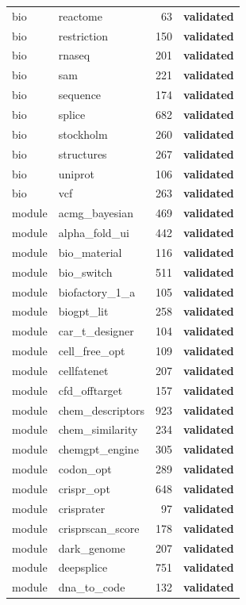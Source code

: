 \begin{center}
\begin{longtable}{llrl}
bio & reactome & 63 & \textbf{validated}\\
bio & restriction & 150 & \textbf{validated}\\
bio & rnaseq & 201 & \textbf{validated}\\
bio & sam & 221 & \textbf{validated}\\
bio & sequence & 174 & \textbf{validated}\\
bio & splice & 682 & \textbf{validated}\\
bio & stockholm & 260 & \textbf{validated}\\
bio & structures & 267 & \textbf{validated}\\
bio & uniprot & 106 & \textbf{validated}\\
bio & vcf & 263 & \textbf{validated}\\
module & acmg\_bayesian & 469 & \textbf{validated}\\
module & alpha\_fold\_ui & 442 & \textbf{validated}\\
module & bio\_material & 116 & \textbf{validated}\\
module & bio\_switch & 511 & \textbf{validated}\\
module & biofactory\_1\_a & 105 & \textbf{validated}\\
module & biogpt\_lit & 258 & \textbf{validated}\\
module & car\_t\_designer & 104 & \textbf{validated}\\
module & cell\_free\_opt & 109 & \textbf{validated}\\
module & cellfatenet & 207 & \textbf{validated}\\
module & cfd\_offtarget & 157 & \textbf{validated}\\
module & chem\_descriptors & 923 & \textbf{validated}\\
module & chem\_similarity & 234 & \textbf{validated}\\
module & chemgpt\_engine & 305 & \textbf{validated}\\
module & codon\_opt & 289 & \textbf{validated}\\
module & crispr\_opt & 648 & \textbf{validated}\\
module & crisprater & 97 & \textbf{validated}\\
module & crisprscan\_score & 178 & \textbf{validated}\\
module & dark\_genome & 207 & \textbf{validated}\\
module & deepsplice & 751 & \textbf{validated}\\
module & dna\_to\_code & 132 & \textbf{validated}\\

\end{longtable}
\end{center}
